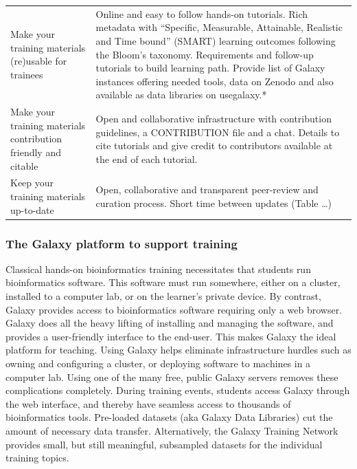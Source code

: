 \documentclass[10pt,letterpaper]{article}
\begin{document}
\begin{table}[h!]
\begin{tabular}{p{}p{}}
		Make your training materials (re)usable for trainees                          & Online and easy to follow hands-on tutorials. Rich metadata with ``Specific, Measurable, Attainable, Realistic and Time bound'' (SMART) learning outcomes following the Bloom's taxonomy. Requirements and follow-up tutorials to build learning path. Provide list of Galaxy instances offering needed tools, data on Zenodo and also available as data libraries on usegalaxy.*\\
		Make your training materials contribution friendly and citable                & Open and collaborative infrastructure with contribution guidelines, a CONTRIBUTION file and a chat. Details to cite tutorials and give credit to contributors available at the end of each tutorial.\\
		Keep your training materials up-to-date                                       & Open, collaborative and transparent peer-review and curation process. Short time between updates (Table …)\\
	\end{tabular}
\end{table}


\subsubsection*{The Galaxy platform to support training}
Classical hands-on bioinformatics training necessitates that students run bioinformatics software.
This software must run somewhere, either on a cluster, installed to a computer lab, or on the learner's private device.
By contrast, Galaxy provides access to bioinformatics software requiring only a web browser.
Galaxy does all the heavy lifting of installing and managing the software, and provides a user-friendly interface to the end-user. This makes Galaxy the ideal platform for teaching. %
Using Galaxy helps eliminate infrastructure hurdles such as owning and configuring a cluster, or deploying software to machines in a computer lab. Using one of the many free, public Galaxy servers removes these complications completely.
During training events, students access Galaxy through the web interface, and thereby have seamless access to thousands of bioinformatics tools.
Pre-loaded datasets (aka Galaxy Data Libraries) cut the amount of necessary data transfer.
Alternatively, the Galaxy Training Network provides small, but still meaningful, subsampled datasets for the individual training topics.
\end{document}
